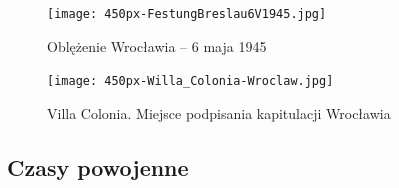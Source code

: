 \documentclass{article}
\begin{document}
\begin{figure}[h!]
\centering
\texttt{[image: 450px-FestungBreslau6V1945.jpg]}
\caption{Oblężenie Wrocławia – 6 maja 1945}
\label{fig:oblez}
\end{figure}

\begin{figure}[h!]
\centering
\texttt{[image: 450px-Willa\_Colonia-Wroclaw.jpg]}
\caption{Villa Colonia. Miejsce podpisania kapitulacji Wrocławia}
\label{fig:villa colonia}
\end{figure}
\newpage











\subsection{Czasy powojenne}
    
\end{document}
